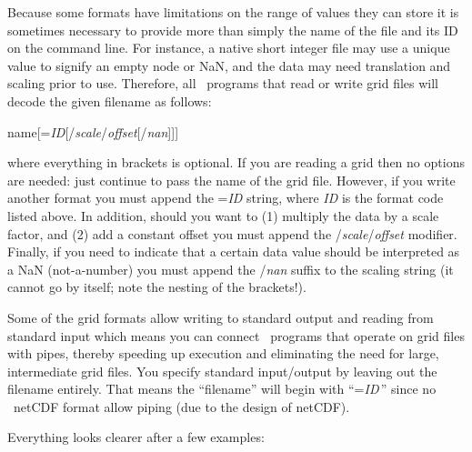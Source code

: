 Because some formats have limitations on the range of values they can store
it is sometimes necessary to provide more
than simply the name of the file and its ID on the command line.  For instance,
a native short integer file may use a unique value to signify an empty node
or NaN, and the data may need translation and scaling prior to use.
Therefore, all \GMT\ programs that read or write grid files will decode
the given filename as follows:

\vspace{\baselineskip} 

\par 	name[=\emph{ID}[/\emph{scale}/\emph{offset}[/\emph{nan}]]]\par 

\vspace{\baselineskip} 

\noindent
where everything in brackets is optional.  If you are reading a grid
then no options are needed: just continue to pass
the name of the grid file.  However, if you write another format you must
append the =\emph{ID} string, where \emph{ID} is the format code
listed above.  In addition, should you want to (1) multiply the data by
a scale factor, and (2) add a constant offset you must append the
/\emph{scale}/\emph{offset} modifier.  Finally, if you need to indicate
that a certain data value should be interpreted as a NaN (not-a-number)
you must append the /\emph{nan} suffix to the scaling string (it cannot
go by itself; note the nesting of the brackets!). 

Some of the grid formats allow writing to standard output and reading
from standard input which means you can connect \GMT\ programs that
operate on grid files with pipes, thereby speeding up execution and
eliminating the need for large, intermediate grid files.  You specify
standard input/output by leaving out the filename entirely.
That means the ``filename'' will begin with
``=\emph{ID}\,'' since no \GMT\  netCDF format 
allow piping (due to the design of netCDF). 

Everything looks clearer after a few examples: 

